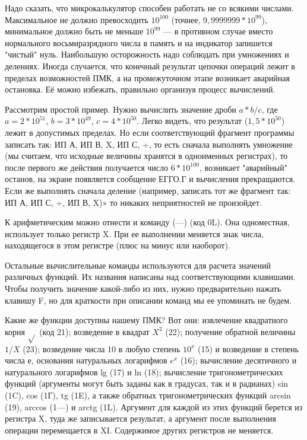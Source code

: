 \documentclass[11pt,a4paper,oneside]{article}
\begin{document}
Надо сказать, что микрокалькулятор способен работать не со всякими числами. Максимальное не должно превосходить $10^{100}$ (точнее, $9,9999999*10^{99}$), минимальное должно быть не меньше $10^{99}$ — в противном случае вместо нормального восьмиразрядного числа в память и на индикатор запишется "чистый" нуль. Наибольшую осторожность надо соблюдать при умножениях и делениях. Иногда случается, что конечный результат цепочки операций лежит в пределах возможностей ПМК, а на промежуточном этапе возникает аварийная остановка. Её можно избежать, правильно организуя процесс вычислений.

Рассмотрим простой пример. Нужно вычислить значение дроби $a*b/c$, где $a=2*10^{51}$, $b=3*10^{49}$, $c=4*10^{50}$. Легко видеть, что результат ($1,5*10^{50}$) лежит в допустимых пределах. Но если соответствующий фрагмент программы записать так: ИП А, ИП В, X, ИП С, ÷, то есть сначала выполнять умножение (мы считаем, что исходные величины хранятся в одноименных регистрах), то после первого же действия получается число $6*10^{100}$, возникает "аварийный" останов, на экране появляется сообщение ЕГГО.Г и вычисления прекращаются. Если же выполнять сначала деление (например, записать тот же фрагмент так: ИП А, ИП С, ÷, ИП В, X)» то никаких неприятностей не произойдет.

К арифметическим можно отнести и команду (—) (код 0L). Она одноместная, использует только регистр X. При ее выполнении меняется знак числа, находящегося в этом регистре (плюс на минус или наоборот).

Остальные вычислительные команды используются для расчета значений различных функций. Их названия написаны над соответствующими клавишами. Чтобы получить значение какой-либо из них, нужно предварительно нажать клавишу F, но для краткости при описании команд мы ее упоминать не будем.

Какие же функции доступны нашему ПМК? Вот они: извлечение квадратного корня $\sqrt{}$ (код 21);
возведение в квадрат $X^{2}$ (22); получение обратной величины $1/X$ (23); возведение числа 10 в любую степень $10^{x}$ (15) и возведение в степень числа е, основания натуральных логарифмов $e^{x}$ (16); вычисление десятичного и натурального логарифмов lg (17) и ln (18); вычисление тригонометрических функций (аргументы могут быть заданы как в градусах, так и в радианах) sin (1C), cos (1Г), tg (1E), а также обратных тригонометрических функций arcsin (19), arccos (1—) и arctg (1L). Аргумент для каждой из этих функций берется из регистра X, туда же записывается результат, а аргумент после выполнения операции перемещается в XI. Содержимое других регистров не меняется.
\end{document}

